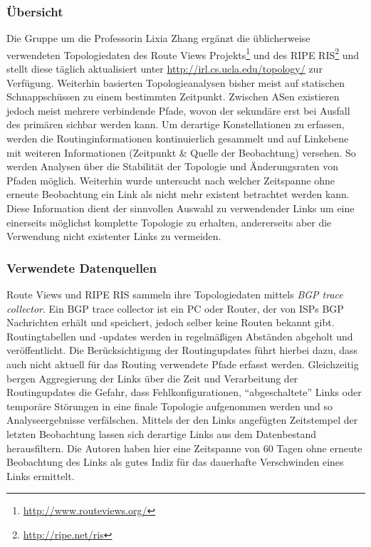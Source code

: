 \subsubsection{Übersicht}
Die Gruppe um die Professorin Lixia Zhang ergänzt die üblicherweise verwendeten Topologiedaten des Route Views Projekts\footnote{\url{http://www.routeviews.org/}} und des RIPE RIS\footnote{\url{http://ripe.net/ris}} und stellt diese täglich aktualisiert unter \url{http://irl.cs.ucla.edu/topology/} zur Verfügung.
Weiterhin basierten Topologieanalysen bisher meist auf statischen Schnappschüssen zu einem bestimmten Zeitpunkt.
Zwischen ASen existieren jedoch meist mehrere verbindende Pfade, wovon der sekundäre erst bei Ausfall des primären sichbar werden kann.
Um derartige Konstellationen zu erfassen, werden die Routinginformationen kontinuierlich gesammelt und auf Linkebene mit weiteren Informationen (Zeitpunkt \& Quelle der Beobachtung) versehen.
So werden Analysen über die Stabilität der Topologie und Änderungsraten von Pfaden möglich.
Weiterhin wurde untersucht nach welcher Zeitspanne ohne erneute Beobachtung ein Link als nicht mehr existent betrachtet werden kann.
Diese Information dient der sinnvollen Auswahl zu verwendender Links um eine einerseits möglichst komplette Topologie zu erhalten, andererseits aber die Verwendung nicht existenter Links zu vermeiden.

\subsubsection{Verwendete Datenquellen}
Route Views und RIPE RIS sammeln ihre Topologiedaten mittels \emph{BGP trace collector}.
Ein BGP trace collector ist ein PC oder Router, der von ISPs BGP Nachrichten erhält und speichert, jedoch selber keine Routen bekannt gibt.
Routingtabellen und -updates werden in regelmäßigen Abständen abgeholt und veröffentlicht.
Die Berücksichtigung der Routingupdates führt hierbei dazu, dass auch nicht aktuell für das Routing verwendete Pfade erfasst werden.
Gleichzeitig bergen Aggregierung der Links über die Zeit und Verarbeitung der Routingupdates die Gefahr, dass Fehlkonfigurationen, "`abgeschaltete"' Links oder temporäre Störungen in eine finale Topologie aufgenommen werden und so Analyseergebnisse verfälschen.
Mittels der den Links angefügten Zeitstempel der letzten Beobachtung lassen sich derartige Links aus dem Datenbestand herausfiltern.
Die Autoren haben hier eine Zeitspanne von 60 Tagen ohne erneute Beobachtung des Links als gutes Indiz für das dauerhafte Verschwinden eines Links ermittelt.\\

